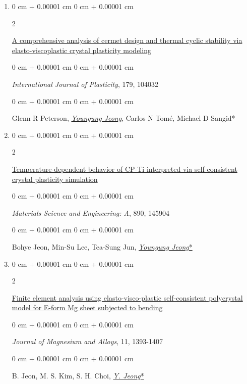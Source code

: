 \documentclass[10pt, letterpaper]{article}
\newenvironment{onecolentry}{
    \begin{adjustwidth}{
        0 cm + 0.00001 cm
    }{
        0 cm + 0.00001 cm
    }
}{
    \end{adjustwidth}
} %
\newenvironment{twocolentry}[2][]{
    \onecolentry
    \def\secondColumn{#2}
    \setcolumnwidth{\fill, 4.5 cm}
    \begin{paracol}{2}
}{
    \switchcolumn \raggedleft \secondColumn
    \end{paracol}
    \endonecolentry
} %
\begin{document}
\begin{enumerate}
        \item
        \begin{twocolentry}{2024}
            \href{https://doi.org/10.1016/j.ijplas.2024.104032}{A comprehensive analysis of cermet design and thermal cyclic stability via elasto-viscoplastic crystal plasticity modeling}
        \end{twocolentry}
        \begin{onecolentry}
            {\it International Journal of Plasticity}, 179, 104032
        \end{onecolentry}
        \begin{onecolentry}
            Glenn R Peterson, {\underline{\textit{Youngung Jeong}}}, Carlos N Tomé, Michael D Sangid*
        \end{onecolentry}
        \vspace{0.10 cm}

        \item
        \begin{twocolentry}{2024}
            \href{https://doi.org/10.1016/j.msea.2023.145904}{Temperature-dependent behavior of CP-Ti interpreted via self-consistent crystal plasticity simulation}
        \end{twocolentry}
        \begin{onecolentry}
            {\it Materials Science and Engineering: A}, 890, 145904
        \end{onecolentry}
        \begin{onecolentry}
            Bohye Jeon, Min-Su Lee, Tea-Sung Jun, {\underline{\textit{Youngung Jeong}*}}
        \end{onecolentry}
        \vspace{0.10 cm}

        \item
        \begin{twocolentry}{2023}
            \href{https://doi.org/10.1016/j.jma.2022.10.017}{Finite element analysis using elasto-visco-plastic self-consistent polycrystal model for E-form Mg sheet subjected to bending}
        \end{twocolentry}
        \begin{onecolentry}
            {\it Journal of Magnesium and Alloys}, 11, 1393-1407
        \end{onecolentry}
        \begin{onecolentry}
            B. Jeon, M. S. Kim, S. H. Choi, {\underline{\textit{Y. Jeong}*}}
        \end{onecolentry}
        \vspace{0.10 cm}


\end{enumerate}
\end{document}
